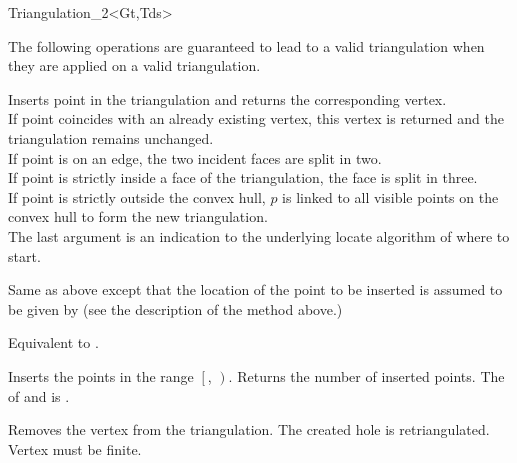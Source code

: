 \begin{ccClassTemplate}{Triangulation_2<Gt,Tds>}

The following operations are guaranteed to lead to a valid triangulation 
when they are applied on a valid triangulation.




{Inserts point  in the triangulation and returns the corresponding
 vertex.\\
If point  coincides with an already existing vertex, this 
vertex is returned and the triangulation remains unchanged.\\
If point  is on an edge, the two incident faces are split 
in two.\\
If point  is strictly inside a face of the triangulation,
the face is split in three.\\
If point  is strictly outside the  convex hull, $p$ is linked
to all visible points on the convex hull to form the new triangulation.\\
The last argument  is an indication to the underlying locate
algorithm of where to start.
}


{Same as above except that the location of the point
  to be inserted is assumed to be given by
 (see the description of the  method above.)}

{Equivalent to .}

{Inserts the points in the range
 $\left[\right.$, $\left.\right)$.
 Returns the number of inserted points.
 \ccPrecond The  of  and 
 is .}

{Removes the vertex from the triangulation. The created hole is 
 retriangulated.
 \ccPrecond Vertex  must be finite.}



\end{ccClassTemplate}
